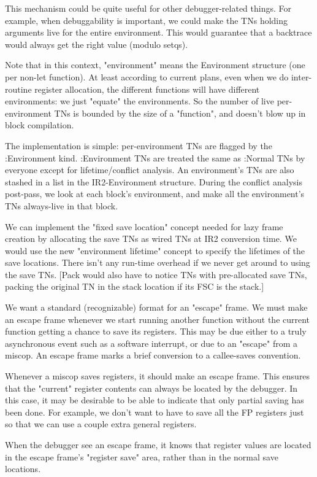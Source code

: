 This mechanism could be quite useful for other debugger-related things.  For
example, when debuggability is important, we could make the TNs holding
arguments live for the entire environment.  This would guarantee that a
backtrace would always get the right value (modulo setqs).  

Note that in this context, "environment" means the Environment structure (one
per non-let function).  At least according to current plans, even when we do
inter-routine register allocation, the different functions will have different
environments: we just "equate" the environments.  So the number of live
per-environment TNs is bounded by the size of a "function", and doesn't blow up
in block compilation.

The implementation is simple: per-environment TNs are flagged by the
:Environment kind.  :Environment TNs are treated the same as :Normal TNs by
everyone except for lifetime/conflict analysis.  An environment's TNs are also
stashed in a list in the IR2-Environment structure.  During the conflict
analysis post-pass, we look at each block's environment, and make all the
environment's TNs always-live in that block.

We can implement the "fixed save location" concept needed for lazy frame
creation by allocating the save TNs as wired TNs at IR2 conversion time.  We
would use the new "environment lifetime" concept to specify the lifetimes of
the save locations.  There isn't any run-time overhead if we never get around
to using the save TNs.  [Pack would also have to notice TNs with pre-allocated
save TNs, packing the original TN in the stack location if its FSC is the
stack.]


We want a standard (recognizable) format for an "escape" frame.  We must make
an escape frame whenever we start running another function without the current
function getting a chance to save its registers.  This may be due either to a
truly asynchronous event such as a software interrupt, or due to an "escape"
from a miscop.  An escape frame marks a brief conversion to a callee-saves
convention.

Whenever a miscop saves registers, it should make an escape frame.  This
ensures that the "current" register contents can always be located by the
debugger.  In this case, it may be desirable to be able to indicate that only
partial saving has been done.  For example, we don't want to have to save all
the FP registers just so that we can use a couple extra general registers.

When the debugger see an escape frame, it knows that register values are
located in the escape frame's "register save" area, rather than in the normal
save locations.

